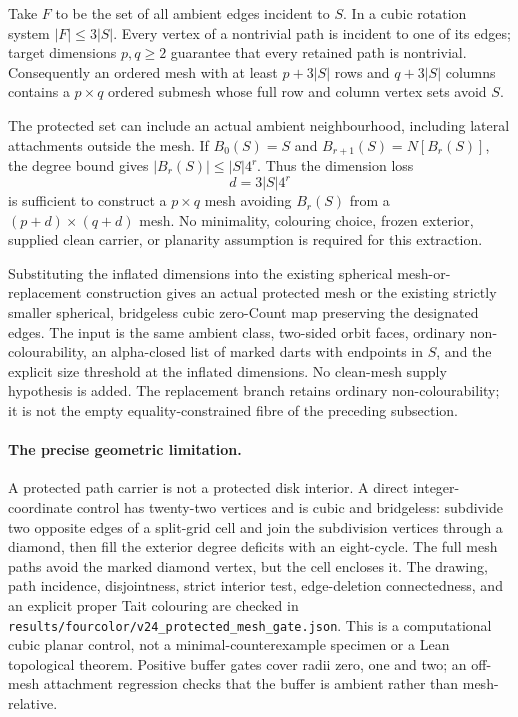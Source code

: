 Take $F$ to be the set of all ambient edges incident to $S$. In a cubic
rotation system $|F|\leq 3|S|$. Every vertex of a nontrivial path is
incident to one of its edges; target dimensions $p,q\geq2$ guarantee
that every retained path is nontrivial. Consequently an ordered mesh
with at least $p+3|S|$ rows and $q+3|S|$ columns contains a $p\times q$
ordered submesh whose full row and column vertex sets avoid $S$.

The protected set can include an actual ambient neighbourhood, including
lateral attachments outside the mesh. If $B_0(S)=S$ and
$B_{r+1}(S)=N[B_r(S)]$, the degree bound gives
$|B_r(S)|\leq |S|4^r$. Thus the dimension loss
\[
 d=3|S|4^r
\]
is sufficient to construct a $p\times q$ mesh avoiding $B_r(S)$ from a
$(p+d)\times(q+d)$ mesh. No minimality, colouring choice, frozen
exterior, supplied clean carrier, or planarity assumption is required
for this extraction.

Substituting the inflated dimensions into the existing spherical
mesh-or-replacement construction gives an actual protected mesh or the
existing strictly smaller spherical, bridgeless cubic zero-Count map
preserving the designated edges. The input is the same ambient class,
two-sided orbit faces, ordinary non-colourability, an alpha-closed list
of marked darts with endpoints in $S$, and the explicit size threshold
at the inflated dimensions. No clean-mesh supply hypothesis is added.
The replacement branch retains ordinary non-colourability; it is not
the empty equality-constrained fibre of the preceding subsection.

\paragraph{The precise geometric limitation.}
A protected path carrier is not a protected disk interior. A direct
integer-coordinate control has twenty-two vertices and is cubic and
bridgeless: subdivide two opposite edges of a split-grid cell and join the
subdivision vertices through a diamond, then fill the exterior degree
deficits with an eight-cycle. The full mesh paths avoid the marked diamond
vertex, but the cell encloses it. The drawing,
path incidence, disjointness, strict interior test, edge-deletion
connectedness, and an explicit proper Tait colouring are checked in
\texttt{results/fourcolor/v24\_protected\_mesh\_gate.json}. This is a
computational cubic planar control, not a minimal-counterexample
specimen or a Lean topological theorem. Positive buffer gates cover
radii zero, one and two; an off-mesh attachment regression checks that
the buffer is ambient rather than mesh-relative.

